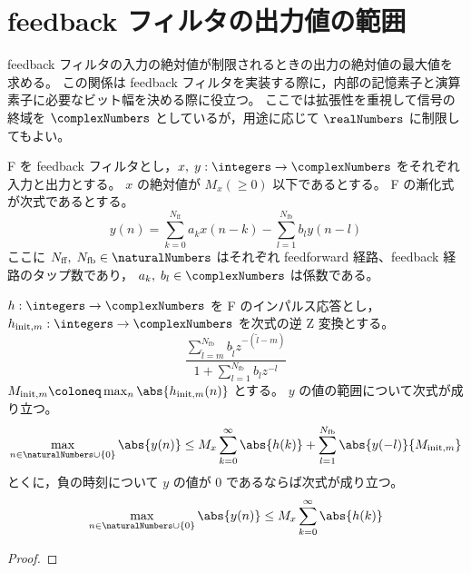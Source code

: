 \section{feedback フィルタの出力値の範囲}
    \newcommand{\Nff}{{N_{\text{ff}}}}
    \newcommand{\Nfb}{{N_{\text{fb}}}}
    \newcommand{\hInit}[1]{{h_{\text{init},#1}}}
    \newcommand{\Minit}[1]{{M_{\text{init},#1}}}
    feedback フィルタの入力の絶対値が制限されるときの出力の絶対値の最大値を求める。
    この関係は feedback フィルタを実装する際に，内部の記憶素子と演算素子に必要なビット幅を決める際に役立つ。
    ここでは拡張性を重視して信号の終域を $\complexNumbers$ としているが，用途に応じて $\realNumbers$ に制限してもよい。
    \begin{shadebox}
        F を feedback フィルタとし，$x,\;y:\integers\to\complexNumbers$ をそれぞれ入力と出力とする。
        $x$ の絶対値が $M_x(\geq 0)$ 以下であるとする。
        F の漸化式が次式であるとする。
        \[ y(n) = \sum_{k=0}^\Nff a_k x(n-k) - \sum_{l=1}^\Nfb b_l y(n-l) \]
        ここに $\Nff,\;\Nfb\in\naturalNumbers$ はそれぞれ feedforward 経路、feedback 経路のタップ数であり， $a_k,\;b_l\in\complexNumbers$ は係数である。
        \par
        $h:\integers\to\complexNumbers$ を F のインパルス応答とし，$\hInit{m}:\integers\to\complexNumbers$ を次式の逆 Z 変換とする。
        \[ \frac{\sum_{\tilde{l}=m}^\Nfb b_{\tilde{l}} z^{-(\tilde{l}-m)}}{1+\sum_{l=1}^\Nfb b_l z^{-l}} \]
        $\Minit{m}\coloneq\max_n {\abs{\hInit{m}(n)}}$ とする。
        $y$ の値の範囲について次式が成り立つ。
        \[ \max_{n\in\naturalNumbers\cup\{0\}}\abs{y(n)} \leq M_x\sum_{k=0}^\infty\abs{h(k)} + \sum_{l=1}^\Nfb\abs{y(-l)}\Minit{m} \]
        とくに，負の時刻について $y$ の値が 0 であるならば次式が成り立つ。
        \[ \max_{n\in\naturalNumbers\cup\{0\}}\abs{y(n)} \leq M_x\sum_{k=0}^\infty\abs{h(k)} \]
    \end{shadebox}
    \begin{proof}
    \end{proof}